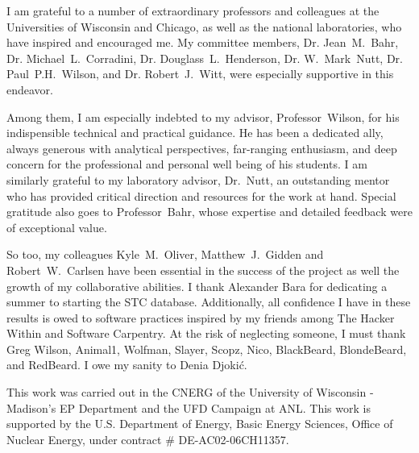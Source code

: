 I am grateful to a number of extraordinary professors and colleagues at the 
Universities of Wisconsin and Chicago, as well as the national laboratories, 
who have inspired and encouraged me. My committee members, Dr. Jean~M.~Bahr, Dr.  
Michael~L.~Corradini, Dr. Douglass~L.~Henderson, Dr. W.~Mark~Nutt, Dr.  
Paul~P.H.~Wilson, and Dr. Robert~J.~Witt, were especially supportive in this 
endeavor.  

Among them, I am especially indebted to my advisor, Professor~Wilson, 
for his indispensible technical and practical guidance. He has been a dedicated 
ally, always generous with analytical perspectives, far-ranging enthusiasm, 
and deep concern for the professional and personal well being of his 
students. I am similarly grateful to my laboratory advisor, Dr.~Nutt, an 
outstanding mentor who has provided critical direction and resources for the 
work at hand. Special gratitude also goes to Professor~Bahr, whose 
expertise and detailed feedback were of exceptional value.  

So too, my colleagues Kyle~M.~Oliver, Matthew~J.~Gidden and Robert~W.~Carlsen 
have been essential in the success of the \Cyclus project as well the growth of 
my collaborative abilities. I thank Alexander Bara for dedicating a summer to 
starting the STC database. Additionally, all confidence I have in 
these results is owed to software practices inspired by my friends among The 
Hacker Within and Software Carpentry. At the risk of neglecting someone, I must 
thank Greg Wilson, Animal1, Wolfman, Slayer, Scopz, Nico,  BlackBeard, 
BlondeBeard, and RedBeard. I owe my sanity to Denia Djoki\'{c}.

This work was carried out in the \gls{CNERG} of the University of Wisconsin - 
Madison's \gls{EP} Department and the \gls{UFD} Campaign at \gls{ANL}. This 
work is supported by the U.S. Department of Energy, Basic Energy Sciences, 
Office of Nuclear Energy, under contract \# DE-AC02-06CH11357.
